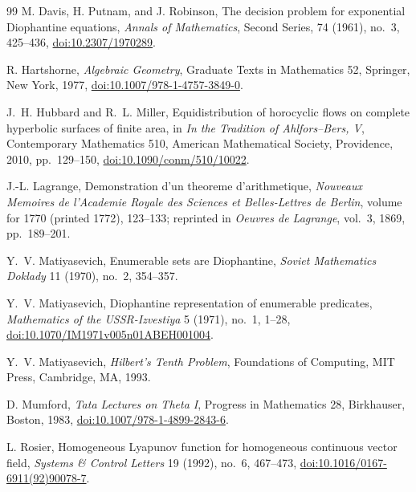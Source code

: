 \documentclass[11pt]{article}
\begin{document}
\begin{thebibliography}{99}
M. Davis, H. Putnam, and J. Robinson,
\newblock The decision problem for exponential Diophantine equations,
\newblock \emph{Annals of Mathematics}, Second Series, 74 (1961), no.~3,
425--436,
\newblock \href{https://doi.org/10.2307/1970289}
{doi:10.2307/1970289}.

R. Hartshorne,
\newblock \emph{Algebraic Geometry},
\newblock Graduate Texts in Mathematics 52, Springer, New York, 1977,
\newblock \href{https://doi.org/10.1007/978-1-4757-3849-0}
{doi:10.1007/978-1-4757-3849-0}.

J.~H. Hubbard and R.~L. Miller,
\newblock Equidistribution of horocyclic flows on complete hyperbolic
surfaces of finite area,
\newblock in \emph{In the Tradition of Ahlfors--Bers, V},
Contemporary Mathematics 510, American Mathematical Society, Providence,
2010, pp.~129--150,
\newblock \href{https://doi.org/10.1090/conm/510/10022}
{doi:10.1090/conm/510/10022}.

J.-L. Lagrange,
\newblock Demonstration d'un theoreme d'arithmetique,
\newblock \emph{Nouveaux Memoires de l'Academie Royale des Sciences et
Belles-Lettres de Berlin}, volume for 1770 (printed 1772), 123--133;
reprinted in \emph{Oeuvres de Lagrange}, vol.~3, 1869, pp.~189--201.

Y.~V. Matiyasevich,
\newblock Enumerable sets are Diophantine,
\newblock \emph{Soviet Mathematics Doklady} 11 (1970), no.~2, 354--357.

Y.~V. Matiyasevich,
\newblock Diophantine representation of enumerable predicates,
\newblock \emph{Mathematics of the USSR-Izvestiya} 5 (1971), no.~1,
1--28,
\newblock \href{https://doi.org/10.1070/IM1971v005n01ABEH001004}
{doi:10.1070/IM1971v005n01ABEH001004}.

Y.~V. Matiyasevich,
\newblock \emph{Hilbert's Tenth Problem},
\newblock Foundations of Computing, MIT Press, Cambridge, MA, 1993.

D. Mumford,
\newblock \emph{Tata Lectures on Theta I},
\newblock Progress in Mathematics 28, Birkhauser, Boston, 1983,
\newblock \href{https://doi.org/10.1007/978-1-4899-2843-6}
{doi:10.1007/978-1-4899-2843-6}.

L. Rosier,
\newblock Homogeneous Lyapunov function for homogeneous continuous vector
field,
\newblock \emph{Systems \& Control Letters} 19 (1992), no.~6, 467--473,
\newblock \href{https://doi.org/10.1016/0167-6911(92)90078-7}
{doi:10.1016/0167-6911(92)90078-7}.


\end{thebibliography}
\end{document}

